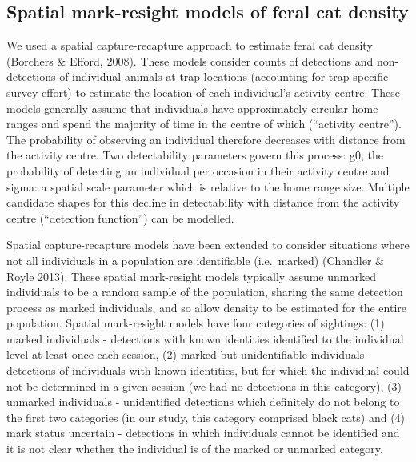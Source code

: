 \documentclass[]{elsarticle} %
\begin{document}
\hypertarget{spatial-mark-resight-models-of-feral-cat-density}{%
\subsection{Spatial mark-resight models of feral cat density}\label{spatial-mark-resight-models-of-feral-cat-density}}

We used a spatial capture-recapture approach to estimate feral cat density (Borchers \& Efford, 2008). These models consider counts of detections and non-detections of individual animals at trap locations (accounting for trap-specific survey effort) to estimate the location of each individual's activity centre. These models generally assume that individuals have approximately circular home ranges and spend the majority of time in the centre of which (``activity centre''). The probability of observing an individual therefore decreases with distance from the activity centre. Two detectability parameters govern this process: g0, the probability of detecting an individual per occasion in their activity centre and sigma: a spatial scale parameter which is relative to the home range size. Multiple candidate shapes for this decline in detectability with distance from the activity centre (``detection function'') can be modelled.

Spatial capture-recapture models have been extended to consider situations where not all individuals in a population are identifiable (i.e.~marked) (Chandler \& Royle 2013). These spatial mark-resight models typically assume unmarked individuals to be a random sample of the population, sharing the same detection process as marked individuals, and so allow density to be estimated for the entire population. Spatial mark-resight models have four categories of sightings: (1) marked individuals - detections with known identities identified to the individual level at least once each session, (2) marked but unidentifiable individuals - detections of individuals with known identities, but for which the individual could not be determined in a given session (we had no detections in this category), (3) unmarked individuals - unidentified detections which definitely do not belong to the first two categories (in our study, this category comprised black cats) and (4) mark status uncertain - detections in which individuals cannot be identified and it is not clear whether the individual is of the marked or unmarked category.
\end{document}
